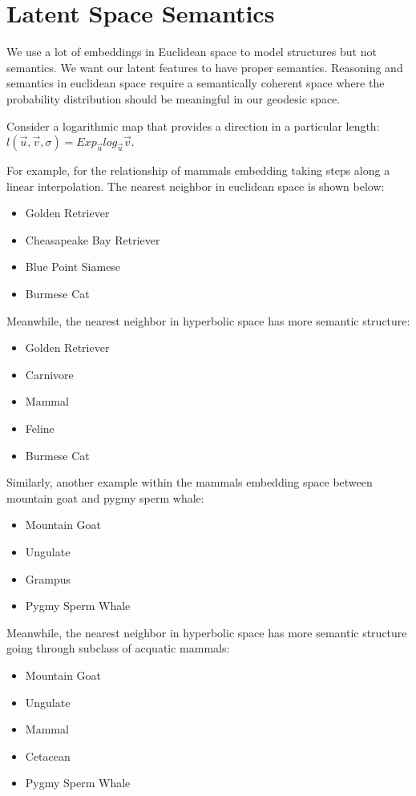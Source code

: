 \section{Latent Space Semantics}

We use a lot of embeddings in Euclidean space to model structures but not semantics. We want our latent features to have proper semantics. Reasoning and semantics in euclidean space require a semantically coherent space where the probability distribution should be meaningful in our geodesic space.  

 Consider a logarithmic map that provides a direction in a particular length:
 $l(\vec{u},\vec{v},\sigma)= Exp_{\vec{u}} log_{\vec{u}}\vec{v}$.
 
 For example, for the relationship of mammals embedding taking steps along a linear interpolation. The nearest neighbor in euclidean space is shown below:
\begin{itemize}
    \item Golden Retriever
    \item Cheasapeake Bay Retriever
    \item Blue Point Siamese
    \item Burmese Cat
\end{itemize}

Meanwhile, the nearest neighbor in hyperbolic space has more semantic structure:
\begin{itemize}
    \item Golden Retriever
    \item Carnivore
    \item Mammal
    \item Feline
    \item Burmese Cat
\end{itemize}

Similarly, another example within the mammals embedding space between mountain goat and pygmy sperm whale:
\begin{itemize}
    \item Mountain Goat
    \item Ungulate
    \item Grampus
    \item Pygmy Sperm Whale
\end{itemize}

Meanwhile, the nearest neighbor in hyperbolic space has more semantic structure going through subclass of acquatic mammals:
\begin{itemize}
    \item Mountain Goat
    \item Ungulate
    \item Mammal
    \item Cetacean
    \item Pygmy Sperm Whale
\end{itemize}

